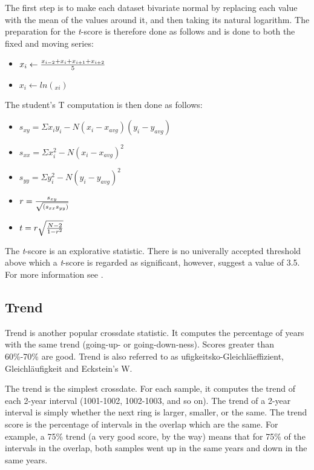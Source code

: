 The first step is to make each dataset bivariate normal by replacing each value with the mean of the values around it, and then taking its natural logarithm.  The preparation for the \textit{t}-score is therefore done as follows and is done to both the fixed and moving series:

\begin{itemize}
 \item $x_{i} \leftarrow {x_{i-2} + x_{i} + x_{i+1} + x_{i+2} \over 5}$
 \item $x_{i} \leftarrow ln(_{xi})$
\end{itemize}

The student's T computation is then done as follows:

\begin{itemize}
 \item $s_{xy} = \Sigma x_{i} y_{i} - N (x_{i} - x_{avg}) (y_{i} - y_{avg})$
 \item $s_{xx} = \Sigma x_{i}^{2} - N (x_{i} - x_{avg})^{2}$
 \item $s_{yy} = \Sigma y_{i}^{2} - N (y_{i} - y_{avg})^{2}$
 \item $r = {s_{xy} \over \sqrt{(s_{xx} s_{yy})}}$
 \item $t = r \sqrt{{N-2\over 1-r^{2}}}$
\end{itemize}

The \textit{t}-score is an explorative statistic.  There is no univerally accepted threshold above which a \textit{t}-score is regarded as  significant, however, \citet{Baillie73} suggest a value of 3.5.  For more information see \citet{wigley1987}.


\subsection{Trend}
Trend is another popular crossdate statistic.  It computes the percentage of years with the same trend (going-up- or going-down-ness). Scores greater than 60\%-70\% are good. Trend is also referred to as ufigkeitsko-Gleichläeffizient, Gleichläufigkeit and Eckstein's W.

The trend is the simplest crossdate. For each sample, it computes the trend of each 2-year interval (1001-1002, 1002-1003, and so on). The trend of a 2-year interval is simply whether the next ring is larger, smaller, or the same. The trend score is the percentage of intervals in the overlap which are the same. For example, a 75\% trend (a very good score, by the way) means that for 75\% of the intervals in the overlap, both samples went up in the same years and down in the same years.


